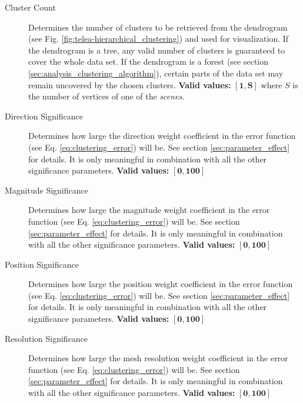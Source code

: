 \begin{description}
\item [Cluster Count] Determines the number of clusters to be retrieved from the dendrogram (see Fig. \ref{fig:telea-hierarchical_clustering}) and used for visualization. If the dendrogram is a tree, any valid number of clusters is guaranteed to cover the whole data set. If the dendrogram is a forest (see section \ref{sec:analysis_clustering_algorithm}), certain parts of the data set may remain uncovered by the chosen clusters. {\bf Valid values:} \(\bm{[1,S]}\) where \(S\) is the number of vertices of one of the {\it scenes}.
\item [Direction Significance] Determines how large the direction weight coefficient in the error function (see Eq. \ref{eq:clustering_error}) will be. See section \ref{sec:parameter_effect} for details. It is only meaningful in combination with all the other significance parameters\footnotemark. {\bf Valid values:} \(\bm{[0,100]}\)
\item [Magnitude Significance] Determines how large the magnitude weight coefficient in the error function (see Eq. \ref{eq:clustering_error}) will be. See section \ref{sec:parameter_effect} for details. It is only meaningful in combination with all the other significance parameters\footnotemark. {\bf Valid values:} \(\bm{[0,100]}\)
\item [Position Significance] Determines how large the position weight coefficient in the error function (see Eq. \ref{eq:clustering_error}) will be. See section \ref{sec:parameter_effect} for details. It is only meaningful in combination with all the other significance parameters\footnotemark. {\bf Valid values:} \(\bm{[0,100]}\)
\item [Resolution Significance] Determines how large the mesh resolution weight coefficient in the error function (see Eq. \ref{eq:clustering_error}) will be. See section \ref{sec:parameter_effect} for details. It is only meaningful in combination with all the other significance parameters\footnotemark. {\bf Valid values:} \(\bm{[0,100]}\)
\end{description}

\addtocounter{footnote}{-4}

